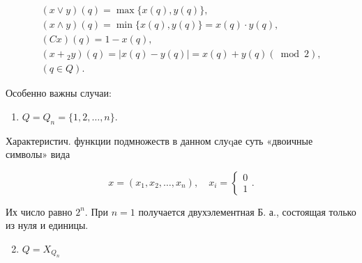 \documentclass[10pt]{article}
\begin{document}
\[

\begin{gathered}

(x \vee y)(q)=\max \{x(q), y(q)\}, \\

(x \wedge y)(q)=\min \{x(q), y(q)\}=x(q) \cdot y(q), \\

(C x)(q)=1-x(q), \\

\left(x+{ }_{2} y\right)(q)=|x(q)-y(q)|=x(q)+y(q)(\bmod 2), \\

(q \in Q) .

\end{gathered}

\]



Особенно важны случаи:



\begin{enumerate}

  \item $Q=Q_{n}=\{1,2, \ldots, n\}$.

\end{enumerate}



Характеристич. функции подмножеств в данном слуqае суть «двоичные символы» вида



\[

x=\left(x_{1}, x_{2}, \ldots, x_{n}\right), \quad x_{i}=\left\{\begin{array}{l}

0 \\

1

\end{array} .\right.

\]



Их число равно $2^{n}$. При $n=1$ получается двухэлементная Б. а., состоящая только из нуля и единицы.



\begin{enumerate}

  \setcounter{enumi}{1}

  \item $Q=X_{Q_{n}}$

\end{enumerate}
\end{document}
